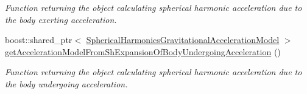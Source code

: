 \begin{DoxyCompactItemize}
\begin{DoxyCompactList}\small\item\em Function returning the object calculating spherical harmonic acceleration due to the body exerting acceleration. \end{DoxyCompactList}\item 
boost\+::shared\+\_\+ptr$<$ \hyperlink{classtudat_1_1gravitation_1_1SphericalHarmonicsGravitationalAccelerationModel}{Spherical\+Harmonics\+Gravitational\+Acceleration\+Model} $>$ \hyperlink{classtudat_1_1gravitation_1_1MutualSphericalHarmonicsGravitationalAccelerationModel_aa92e6776706d5a05bcd1b0cd932f2c4f}{get\+Acceleration\+Model\+From\+Sh\+Expansion\+Of\+Body\+Undergoing\+Acceleration} ()
\begin{DoxyCompactList}\small\item\em Function returning the object calculating spherical harmonic acceleration due to the body undergoing acceleration. \end{DoxyCompactList}\end{DoxyCompactItemize}

